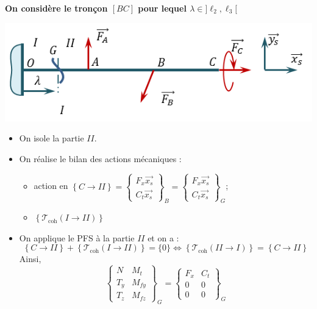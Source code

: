 \documentclass[10pt,fleqn]{article} %
\begin{document}
\begin{multicols}{2}
\textbf{On considère le tronçon $[BC]$ pour lequel $\lambda \in ]\ell_2,\ell_3[$}
\begin{center}
\includegraphics[width=.5\linewidth]{images/corr_01}
\end{center}
\begin{itemize}
\item On isole la partie $II$. 
\item On réalise le bilan des actions mécaniques : 
\begin{itemize}
\item action en $\left\{ C \rightarrow II \right\}= \begin{Bmatrix} F_x\overrightarrow{x_s}\\
C_t\overrightarrow{x_s}\end{Bmatrix}_B= \begin{Bmatrix} F_x\overrightarrow{x_s}\\
C_t\overrightarrow{x_s}\end{Bmatrix}_G$;
\item $\left\{ \mathcal{T}_{\text{coh}} \left(I \rightarrow II\right) \right\}$
\end{itemize}
\item On applique le PFS à la partie $II$ et on a : 
$$
\left\{ C\rightarrow II \right\}
+\left\{ \mathcal{T}_{\text{coh}} \left(I \rightarrow II\right) \right\} = \{0\}
\Leftrightarrow
\left\{ \mathcal{T}_{\text{coh}} \left(II \rightarrow I\right) \right\}  =  \left\{ C\rightarrow II \right\}
$$ 
Ainsi, 
$$
\begin{Bmatrix} 
N & M_t \\
T_y & M_{fy} \\
T_z & M_{fz} 
\end{Bmatrix}_G
=
\begin{Bmatrix} 
F_x& C_t \\
0& 0 \\
0 &  0
\end{Bmatrix}_G
$$
\end{itemize}



\end{multicols}
\end{document}
